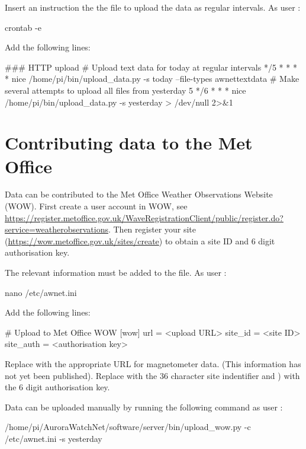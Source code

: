 Insert an instruction the the  file to upload the
data as regular intervals. As user \piUser:
\begin{Cmd}
crontab -e
\end{Cmd}
Add the following lines:
\begin{Code}[fontsize=\small]
### HTTP upload
# Upload text data for today at regular intervals
*/5 * * * * nice /home/pi/bin/upload_data.py -s today --file-types awnettextdata
# Make several attempts to upload all files from yesterday
5 */6 * * * nice /home/pi/bin/upload_data.py -s yesterday > /dev/null 2>&1
\end{Code}

\section{Contributing data to the Met Office}

Data can be contributed to the Met Office Weather Observations Website
(WOW). First create a user account in WOW, see
\url{https://register.metoffice.gov.uk/WaveRegistrationClient/public/register.do?service=weatherobservations}. Then
register your site (\url{https://wow.metoffice.gov.uk/sites/create})
to obtain a site ID and 6 digit authorisation key.

The relevant information must be added to the
 file. As user \rootUser:
\begin{Cmd}
nano /etc/awnet.ini 
\end{Cmd}

Add the following lines:
\begin{Code}
# Upload to Met Office WOW
[wow]
url = <upload URL>
site_id = <site ID>
site_auth = <authorisation key>
\end{Code}

Replace  with the appropriate URL for magnetometer
data. (This information has not yet been published). Replace
 with the 36 character site indentifier and
) with the 6 digit authorisation key.

Data can be uploaded manually by running the following command as user \piUser:
\begin{Cmd}[fontsize=\relsize{-1.5}]
/home/pi/AuroraWatchNet/software/server/bin/upload_wow.py -c /etc/awnet.ini -s yesterday
\end{Cmd}


